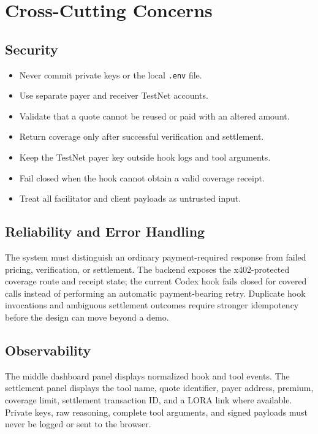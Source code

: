 \documentclass[11pt]{article}
\begin{document}
\section{Cross-Cutting Concerns}

\subsection{Security}

\begin{itemize}[leftmargin=*]
  \item Never commit private keys or the local \texttt{.env} file.
  \item Use separate payer and receiver TestNet accounts.
  \item Validate that a quote cannot be reused or paid with an altered amount.
  \item Return coverage only after successful verification and settlement.
  \item Keep the TestNet payer key outside hook logs and tool arguments.
  \item Fail closed when the hook cannot obtain a valid coverage receipt.
  \item Treat all facilitator and client payloads as untrusted input.
\end{itemize}

\subsection{Reliability and Error Handling}

The system must distinguish an ordinary payment-required response from failed
pricing, verification, or settlement. The backend exposes the x402-protected
coverage route and receipt state; the current Codex hook fails closed for
covered calls instead of performing an automatic payment-bearing retry.
Duplicate hook invocations and ambiguous settlement outcomes require stronger
idempotency before the design can move beyond a demo.

\subsection{Observability}

The middle dashboard panel displays normalized hook and tool events. The
settlement panel displays the tool name, quote identifier, payer address,
premium, coverage limit, settlement transaction ID, and a LORA link where
available. Private keys, raw reasoning, complete tool arguments, and signed
payloads must never be logged or sent to the browser.
\end{document}

